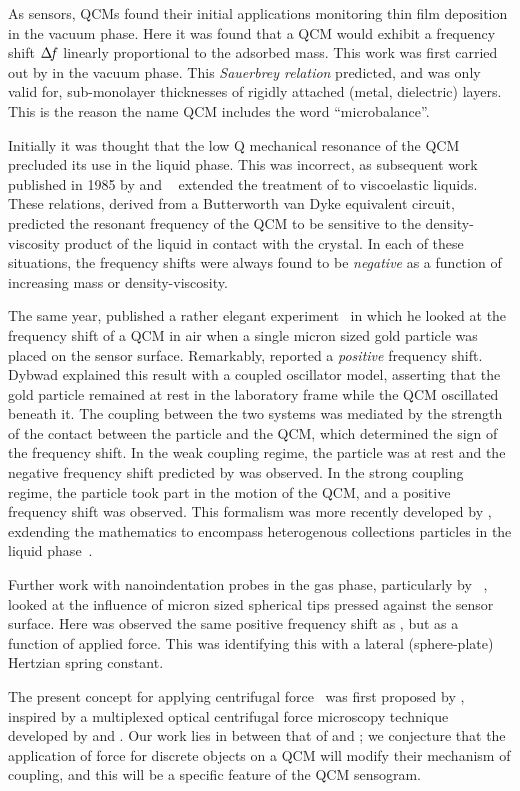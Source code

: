 As sensors, QCMs found their initial applications monitoring thin film
deposition in the vacuum phase.  Here it was found that a QCM would exhibit
a frequency shift $\Delta\!f$ linearly proportional to the adsorbed mass.  This
work was first carried out by  in the vacuum phase.  This
\textit{Sauerbrey relation} predicted, and was only valid for,
sub-monolayer thicknesses of rigidly attached (metal, dielectric) layers.
This is the reason the name QCM includes the word ``microbalance''.

Initially it was thought that the low Q mechanical resonance of the QCM
precluded its use in the liquid phase.  This was incorrect, as subsequent
work published in 1985 by  and
~\cite{kanazawa1985frequency} extended the treatment of
 to viscoelastic liquids.  These relations, derived from a
Butterworth van Dyke equivalent circuit, predicted the resonant frequency
of the QCM to be sensitive to the density-viscosity product of the liquid
in contact with the crystal.  In each of these situations, the frequency
shifts were always found to be \textit{negative} as a function of
increasing mass or density-viscosity.

The same year,  published a rather elegant
experiment~\cite{dybwad1985sensitive} in which he looked at the frequency
shift of a QCM in air when a single micron sized gold particle was placed
on the sensor surface.  Remarkably,  reported a
\textit{positive} frequency shift.  Dybwad explained this result with a
coupled oscillator model, asserting that the gold particle remained at rest
in the laboratory frame while the QCM oscillated beneath it.  The coupling
between the two systems was mediated by the strength of the contact between
the particle and the QCM, which determined the sign of the frequency shift.
In the weak coupling regime, the particle was at rest and the negative
frequency shift predicted by  was observed.  In the strong
coupling regime, the particle took part in the motion of the QCM, and a
positive frequency shift was observed.  This formalism was more recently
developed by , exdending the mathematics to encompass
heterogenous collections particles in the liquid
phase~\cite{johannsman2007contacts}.

Further work with nanoindentation probes in the gas phase, particularly by
~\cite{borovsky2001measuring}, looked at the influence of
micron sized spherical tips pressed against the sensor surface.  Here was
observed the same positive frequency shift as , but as a
function of applied force.  This was identifying this with a lateral
(sphere-plate) Hertzian spring constant.

The present concept for applying centrifugal force~\cite{webster2013qcm}
was first proposed by , inspired by a multiplexed optical
centrifugal force microscopy technique~\cite{halvorsen2010massively}
developed by  and .  Our work lies in between
that of  and ; we conjecture that the
application of force for discrete objects on a QCM will modify their
mechanism of coupling, and this will be a specific feature of the QCM
sensogram.
